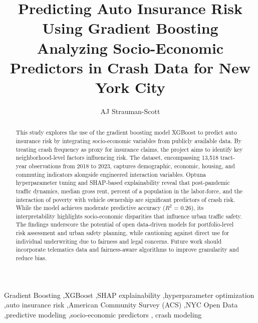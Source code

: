 \documentclass[
  number,
  review,
  3p]{elsarticle}
\begin{document}
\begin{frontmatter}
\title{Predicting Auto Insurance Risk Using Gradient
Boosting \\\large{Analyzing Socio-Economic Predictors in Crash Data for
New York City} }
\author[1]{AJ Strauman-Scott%
%
}



        
\begin{abstract}
This study explores the use of the gradient boosting model XGBoost to
predict auto insurance risk by integrating socio-economic variables from
publicly available data. By treating crash frequency as proxy for
insurance claims, the project aims to identify key neighborhood-level
factors influencing risk. The dataset, encompassing 13,518 tract-year
observations from 2018 to 2023, captures demographic, economic, housing,
and commuting indicators alongside engineered interaction variables.
Optuna hyperparameter tuning and SHAP-based explainability reveal that
post-pandemic traffic dynamics, median gross rent, percent of a
population in the labor-force, and the interaction of poverty with
vehicle ownership are significant predictors of crash risk. While the
model achieves moderate predictive accuracy (\(R^2\) = 0.26), its
interpretability highlights socio-economic disparities that influence
urban traffic safety. The findings underscore the potential of open
data-driven models for portfolio-level risk assessment and urban safety
planning, while cautioning against direct use for individual
underwriting due to fairness and legal concerns. Future work should
incorporate telematics data and fairness-aware algorithms to improve
granularity and reduce bias.
\end{abstract}





\begin{keyword}
    Gradient Boosting \sep XGBoost \sep SHAP
explainability \sep hyperparameter optimization \sep auto insurance
risk \sep American Community Survey (ACS) \sep NYC Open
Data \sep predictive modeling \sep socio-economic predictors \sep 
    crash modeling
\end{keyword}
\end{frontmatter}
    
\end{document}
